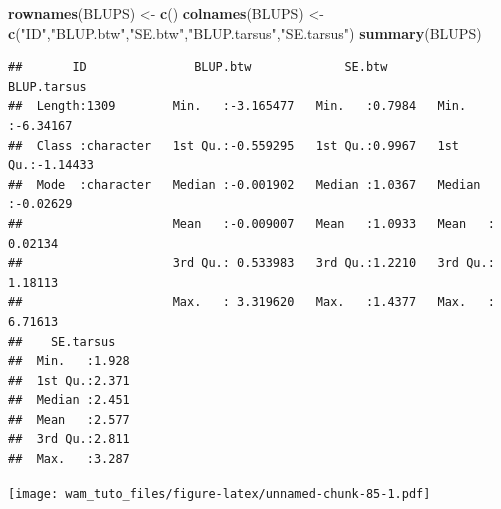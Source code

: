 \documentclass[
  12pt,
]{book}
\newenvironment{Shaded}{\begin{snugshade}}{\end{snugshade}}
\newcommand{\CommentTok}[1]{\textcolor[rgb]{0.56,0.35,0.01}{\textit{#1}}}
\newcommand{\DataTypeTok}[1]{\textcolor[rgb]{0.13,0.29,0.53}{#1}}
\newcommand{\DecValTok}[1]{\textcolor[rgb]{0.00,0.00,0.81}{#1}}
\newcommand{\KeywordTok}[1]{\textcolor[rgb]{0.13,0.29,0.53}{\textbf{#1}}}
\newcommand{\NormalTok}[1]{#1}
\newcommand{\OperatorTok}[1]{\textcolor[rgb]{0.81,0.36,0.00}{\textbf{#1}}}
\newcommand{\StringTok}[1]{\textcolor[rgb]{0.31,0.60,0.02}{#1}}
\begin{document}
\begin{Shaded}
\begin{Highlighting}[]
\KeywordTok{rownames}\NormalTok{(BLUPS) \textless{}{-}}\StringTok{ }\KeywordTok{c}\NormalTok{()}
\KeywordTok{colnames}\NormalTok{(BLUPS) \textless{}{-}}\StringTok{ }\KeywordTok{c}\NormalTok{(}\StringTok{"ID"}\NormalTok{,}\StringTok{"BLUP.btw"}\NormalTok{,}\StringTok{"SE.btw"}\NormalTok{,}\StringTok{"BLUP.tarsus"}\NormalTok{,}\StringTok{"SE.tarsus"}\NormalTok{)}
\KeywordTok{summary}\NormalTok{(BLUPS)}
\end{Highlighting}
\end{Shaded}

\begin{verbatim}
##       ID               BLUP.btw             SE.btw        BLUP.tarsus      
##  Length:1309        Min.   :-3.165477   Min.   :0.7984   Min.   :-6.34167  
##  Class :character   1st Qu.:-0.559295   1st Qu.:0.9967   1st Qu.:-1.14433  
##  Mode  :character   Median :-0.001902   Median :1.0367   Median :-0.02629  
##                     Mean   :-0.009007   Mean   :1.0933   Mean   : 0.02134  
##                     3rd Qu.: 0.533983   3rd Qu.:1.2210   3rd Qu.: 1.18113  
##                     Max.   : 3.319620   Max.   :1.4377   Max.   : 6.71613  
##    SE.tarsus    
##  Min.   :1.928  
##  1st Qu.:2.371  
##  Median :2.451  
##  Mean   :2.577  
##  3rd Qu.:2.811  
##  Max.   :3.287
\end{verbatim}

\begin{Shaded}
\end{Shaded}

\texttt{[image: wam\_tuto\_files/figure-latex/unnamed-chunk-85-1.pdf]}
\end{document}
